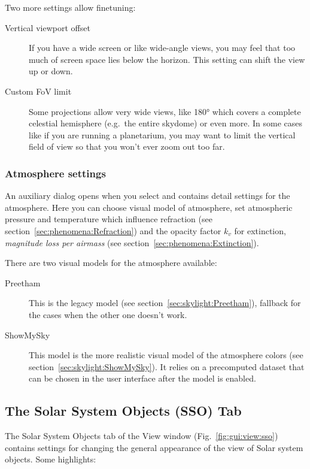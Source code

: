 \noindent Two more settings allow finetuning:
\begin{description}
\item[Vertical viewport offset] If you have a wide screen or like wide-angle views,
you may feel that too much of screen space lies below the horizon. This setting can shift the view up or down.
\item[Custom FoV limit] Some projections allow very wide views, like 180°
which covers a complete  celestial hemisphere (e.g.\ the entire skydome)
or even more. In some cases like if you are running a planetarium, you may want
to limit the vertical field of view so that you won't ever zoom out too far.
\end{description}

\subsubsection{Atmosphere settings}
\label{sec:gui:view:sky:atmosphere}

An auxiliary dialog opens when you select 
and contains detail settings for the atmosphere. Here
you can choose visual model of atmosphere, set atmospheric pressure and temperature which influence
refraction (see section~\ref{sec:phenomena:Refraction}) and the
opacity factor $k_v$ for extinction, \emph{magnitude loss per airmass} 
(see section~\ref{sec:phenomena:Extinction}).

There are two visual models for the atmosphere available:
\begin{description}
  \item[Preetham] This is the legacy model (see section~\ref{sec:skylight:Preetham}), fallback for the cases
    when the other one doesn't work.
  \item[ShowMySky] This model is the more realistic visual model of
    the atmosphere colors (see section~\ref{sec:skylight:ShowMySky}). It
    relies on a precomputed dataset that can be chosen in the user
    interface after the  model is enabled.
\end{description}

\subsection{The Solar System Objects (SSO) Tab}
\label{sec:gui:view:sso}

The Solar System Objects tab of the View window (Fig.~\ref{fig:gui:view:sso}) contains settings
for changing the general appearance of the view of Solar system objects. Some highlights:

